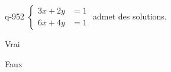 \begin{truefalse}{q-952}
$\begin{cases}3x+2y &= 1 \\ 6x+4y &= 1\end{cases}$ admet des solutions.
\item Vrai
\item* Faux
\end{truefalse}


